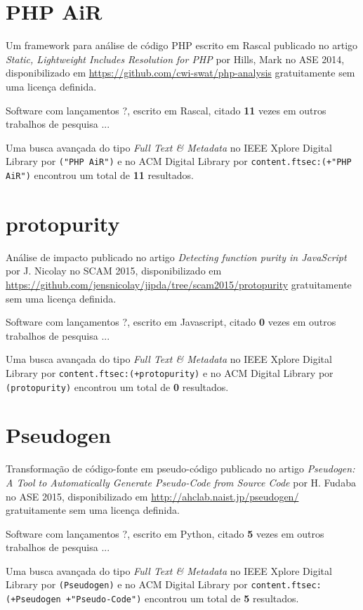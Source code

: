 \section{PHP AiR}

Um framework para análise de código PHP escrito em Rascal
publicado no artigo {\it Static, Lightweight Includes Resolution for PHP}
por Hills, Mark
no ASE 2014,
disponibilizado em \url{https://github.com/cwi-swat/php-analysis}
gratuitamente
sem uma licença definida.

Software com lançamentos ?,
escrito em Rascal,
citado {\bf 11} vezes em outros trabalhos de pesquisa ...

Uma busca avançada do tipo {\it Full Text \& Metadata} no IEEE Xplore Digital Library por
\texttt{("PHP AiR")}
e no ACM Digital Library por
\texttt{content.ftsec:(+"PHP AiR")}
encontrou um total de
{\bf 11}
resultados.

\section{protopurity}

Análise de impacto
publicado no artigo {\it Detecting function purity in JavaScript}
por J. Nicolay
no SCAM 2015,
disponibilizado em \url{https://github.com/jensnicolay/jipda/tree/scam2015/protopurity}
gratuitamente
sem uma licença definida.

Software com lançamentos ?,
escrito em Javascript,
citado {\bf 0} vezes em outros trabalhos de pesquisa ...

Uma busca avançada do tipo {\it Full Text \& Metadata} no IEEE Xplore Digital Library por
\texttt{content.ftsec:(+protopurity)}
e no ACM Digital Library por
\texttt{(protopurity)}
encontrou um total de
{\bf 0}
resultados.

\section{Pseudogen}

Transformação de código-fonte em pseudo-código
publicado no artigo {\it Pseudogen: A Tool to Automatically Generate Pseudo-Code from Source Code}
por H. Fudaba
no ASE 2015,
disponibilizado em \url{http://ahclab.naist.jp/pseudogen/}
gratuitamente
sem uma licença definida.

Software com lançamentos ?,
escrito em Python,
citado {\bf 5} vezes em outros trabalhos de pesquisa ...

Uma busca avançada do tipo {\it Full Text \& Metadata} no IEEE Xplore Digital Library por
\texttt{(Pseudogen)}
e no ACM Digital Library por
\texttt{content.ftsec:(+Pseudogen +"Pseudo-Code")}
encontrou um total de
{\bf 5}
resultados.

